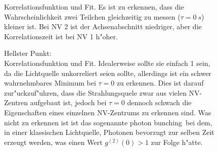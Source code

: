 \begin{figure}[htbp]
    \centering
    \begin{subfigure}{0.49\textwidth}
        \centering
        
        \label{fig:g12:1}
    \end{subfigure}
    \hfill
    \begin{subfigure}{0.49\textwidth}
        \centering
        
        \label{fig:g12:2}
    \end{subfigure}
    \caption{
        Korrelationsfunktion und Fit.
        Es ist zu erkennen, dass die Wahrscheinlichkeit zwei Teilchen gleichzeitig zu messen ($\tau=\SI{0}{s}$) kleiner ist.
        Bei NV 2 ist der Achsenabschnitt niedriger, aber die Korrelationszeit ist bei NV 1 h"oher.
    }
    \label{fig:g12}
\end{figure}

\begin{figure}[htbp]
    \centering
    
    \caption{
        Hellster Punkt:
        \\
        Korrelationsfunktion und Fit.
        Idealerweise sollte sie einfach 1 sein, da die Lichtquelle unkorreliert seien sollte, allerdings ist ein schwer wahrnehmbares Minimum bei $\tau=0$ zu erkennen.
        Dies ist darauf zur"uckzuf"uhren, dass die Strahlungsquele zwar aus vielen NV-Zentren aufgebaut ist, jedoch bei $\tau=0$ dennoch schwach die Eigenschaften eines einzelnen NV-Zentrums zu erkennen sind.
        Was nicht zu erkennen ist ist das sogenannte \glqq photon bunching\grqq\ bei dem, in einer klassischen Lichtquelle, Photonen bevorzugt zur selben Zeit erzeugt werden, was einen Wert $g^{(2)}(0)>1$ zur Folge h"atte.
    }
    \label{fig:g3}
\end{figure}
